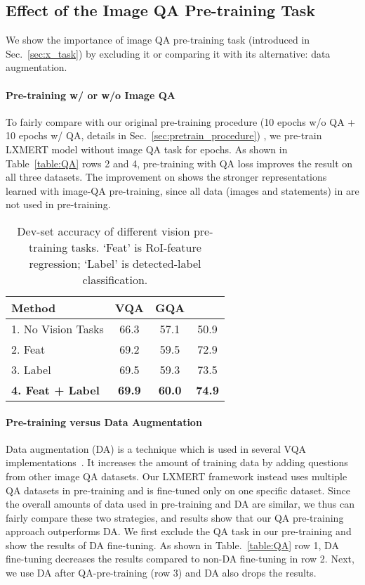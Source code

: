 \documentclass[11pt,a4paper]{article}
\begin{document}
\subsection{Effect of the Image QA Pre-training Task}
\label{sec:QA_analysis}
We show the importance of image QA pre-training task (introduced in Sec.~\ref{sec:x_task}) by excluding it or comparing it with its alternative: data augmentation.
\paragraph{Pre-training w/ or w/o Image QA}
To fairly compare with our original pre-training procedure (10 epochs w/o QA + 10 epochs w/ QA, details in Sec.~\ref{sec:pretrain_procedure}) , we pre-train LXMERT model without image QA task for  epochs.
As shown in Table~\ref{table:QA} rows 2 and 4, pre-training with QA loss improves the result on all three datasets. 
The  improvement on  shows the stronger representations learned with image-QA pre-training, since all data (images and statements) in  are not used in pre-training.

\begin{table}[]
\centering
\begin{tabular}{lccc}
\toprule
Method                                & VQA   & GQA  &  \\
\midrule
1. No Vision Tasks                     & 66.3  & 57.1 & 50.9 \\
2. Feat                                & 69.2  & 59.5 & 72.9 \\
3. Label                               & 69.5  & 59.3 & 73.5 \\
\textbf{4. Feat + Label}               & \textbf{69.9}  & \textbf{60.0} & \textbf{74.9} \\
\bottomrule
\end{tabular}
\vspace{-5pt}
\caption{Dev-set accuracy of different vision pre-training tasks. `Feat' is RoI-feature regression; `Label' is detected-label classification. }
\vspace{-10pt}
\label{table:vision}
\end{table}

\paragraph{Pre-training versus Data Augmentation}
Data augmentation (DA) is a technique which is used in several VQA implementations~\cite{anderson2018bottom, kim2018bilinear, jiang2018pythia}.
It increases the amount of training data by adding questions from other image QA datasets.
Our LXMERT framework instead uses multiple QA datasets in pre-training and is fine-tuned only on one specific dataset.
Since the overall amounts of data used in pre-training and DA are similar, we thus can fairly compare these two strategies, and results show that our QA pre-training approach outperforms DA.
We first exclude the QA task in our pre-training and show the results of DA fine-tuning.
As shown in Table.~\ref{table:QA} row 1, DA fine-tuning decreases the results compared to non-DA fine-tuning in row 2.
Next, we use DA after QA-pre-training (row 3) and DA also drops the results. 
\end{document}
